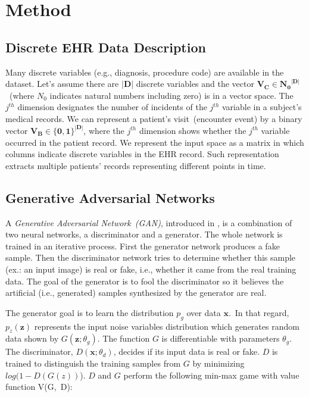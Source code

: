 \documentclass[letterpaper]{article} \usepackage{aaai20}  \usepackage{times}  \usepackage{helvet} \usepackage{courier}  \usepackage[hyphens]{url}  \usepackage{graphicx} \urlstyle{rm} \def\UrlFont{\rm}  \usepackage{graphicx}  \frenchspacing  \setlength{\pdfpagewidth}{8.5in}  \setlength{\pdfpageheight}{11in}
\begin{document}
\section{Method}\label{sec:Method}

\subsection{Discrete EHR Data Description}\label{sec:Methodsub:Data Description}

Many discrete variables (e.g., diagnosis, procedure code) are available in the dataset.
Let's assume there are $\boldsymbol{|D|}$ discrete variables and the vector $\boldsymbol{V_C \in {N_0 }^{|D|}}$~(where $N_0$ indicates natural numbers including zero) is in a vector space.
The $j^{th}$ dimension designates the number of incidents of the $j^{th}$ variable in a subject's medical records.
We can represent a patient's visit~(encounter event) by a binary vector $\boldsymbol{V_B \in {\{0,1\} }^{|D|}}$, where the $j^{th}$ dimension shows whether the $j^{th}$ variable occurred in the patient record.
We represent the input space as a matrix in which columns indicate discrete variables in the EHR record. Such representation extracts multiple patients' records representing different points in time.


\subsection{Generative Adversarial Networks}\label{sec:Methodsub:Preliminary}

A \textit{Generative Adversarial Network~(GAN)}, introduced in \cite{goodfellow2014generative}, is a combination of two neural networks, a discriminator and a generator.
The whole network is trained in an iterative process.
First the generator network produces a fake sample.
Then the discriminator network tries to determine whether this sample (ex.: an input image) is real or fake, i.e., whether it came from the real training data.
The goal of the generator is to fool the discriminator so it believes the artificial (i.e., generated) samples synthesized by the generator are real.


The generator goal is to learn the distribution $p_g$ over data $\textbf{x}$.~In that regard,~$p_z(\textbf{z})$ represents the input noise variables distribution which generates random data shown by $G(\textbf{z}; \theta_g)$.
The function $G$ is differentiable with parameters $\theta_g$.
The discriminator, $D(\textbf{x}; \theta_d)$, decides if its input data is real or fake.
$D$ is trained to distinguish the training samples from $G$ by minimizing $ log(1 - D(G(z))$).
$D$ and $G$ perform the following min-max game with value function V(G,~D):
\end{document}
